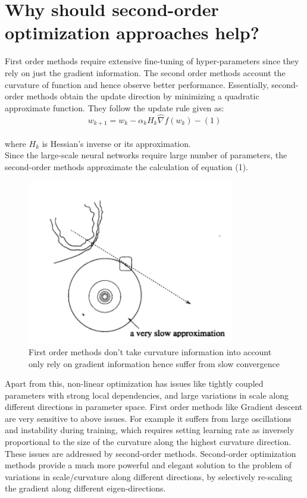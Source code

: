 \documentclass[journal]{IEEEtran}
\begin{document}
\section{Why should second-order optimization approaches help?}
First order methods require extensive fine-tuning of hyper-parameters since they rely on just the gradient information. The second order methods account the curvature of function and hence observe better performance. Essentially, second-order methods obtain the update direction by minimizing a quadratic approximate function. They follow the update rule given as: \\
$$ w_{k+1}=w_{k}-\alpha_{k} H_{k} \hat{\nabla} f\left(w_{k}\right) -(1)$$  \\
where $ H_{k}$ is Hessian's inverse or its approximation. \\
Since the large-scale neural networks require large number of parameters, the second-order methods approximate the calculation of equation (1). \\
\begin{figure}%
\centering
\includegraphics[width=.9\linewidth]{Figures/convergence}
\caption{First order methods don't take curvature information into account only rely on gradient information hence suffer from slow convergence}
\label{table:Comparison}
\end{figure}
Apart from this, non-linear optimization has issues like tightly coupled parameters with strong local dependencies, and large variations in scale along different directions in parameter space. First order methods like Gradient descent are very sensitive to above issues. For example it suffers from large oscillations and instability during training, which requires setting learning rate as inversely proportional to the size of the curvature along the highest curvature direction. These issues are addressed by second-order methods. Second-order optimization methods provide a much more powerful and elegant solution to the problem of variations in scale/curvature along different directions, by selectively re-scaling the gradient along different eigen-directions.
\end{document}
